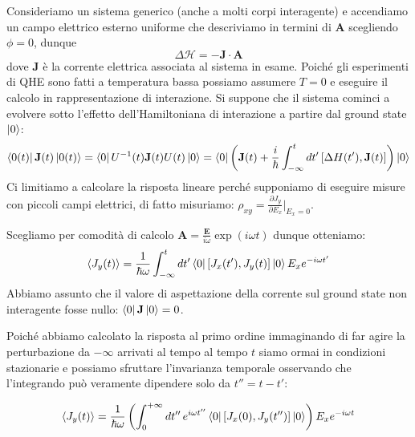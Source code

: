 \documentclass[12pt,a4paper]{article}
\begin{document}
Consideriamo un sistema generico (anche  a molti corpi interagente) e accendiamo un campo elettrico esterno uniforme che descriviamo in  termini di $\mathbf{A}$ scegliendo $\phi = 0$, dunque $$\Delta \mathcal{H} = - \mathbf{J} \cdot \mathbf{A}$$ dove $\mathbf{J}$ è la corrente elettrica associata al sistema in esame.
Poiché gli esperimenti di QHE sono fatti a temperatura bassa possiamo assumere $T = 0$ e eseguire il calcolo in rappresentazione di interazione. Si suppone che il sistema cominci a evolvere sotto l'effetto dell'Hamiltoniana di interazione a partire dal ground state $\ket{0}$:
\begin{equation}
\bra{0(t)} \mathbf{J}(t) \ket{0(t)} = \bra{0} U^{-1} (t) \mathbf{J}(t) U(t) \ket{0} = \bra{0} \left( \mathbf{J}(t) + \frac{i}{\hbar} \int_{-\infty}^{t} dt' \left[\Delta H (t'), \mathbf{J}(t)\right] \right) \ket{0}
\end{equation} \label{calcolo}
Ci limitiamo a calcolare la risposta lineare perché supponiamo di eseguire misure con piccoli campi elettrici, di fatto misuriamo: $\rho_{xy} = \frac{\partial J_y}{\partial E_x} \Bigr|_{E_x = 0}$. 

Scegliamo per comodità di calcolo $\mathbf{A} = \frac{\mathbf{E}}{i \omega} \exp \left( i \omega t \right)$ dunque otteniamo:
\begin{equation}
\langle J_y(t) \rangle = \frac{1}{\hbar \omega} \int_{-\infty}^{t} dt' \bra{0} \left[ J_{x} (t'), J_{y}(t) \right] \ket{0} E_{x} e^{-i \omega t'}
\end{equation}
Abbiamo assunto che il valore di aspettazione della corrente sul ground state non interagente fosse nullo: $\bra{0} \mathbf{J} \ket{0} = 0$.

Poiché abbiamo calcolato la risposta al primo ordine immaginando di far agire la perturbazione da $-\infty$ arrivati al tempo al tempo $t$ siamo ormai in condizioni stazionarie e possiamo sfruttare l'invarianza temporale osservando che l'integrando può veramente dipendere solo da $t'' = t - t'$:

\begin{equation}
\langle J_y(t) \rangle = \frac{1}{\hbar \omega} \left( \int_{0}^{+\infty} dt'' \, e^{i \omega t''} \bra{0} \left[ J_{x} (0), J_{y}(t'') \right] \ket{0} \right) E_{x} e^{-i \omega t}
\end{equation}
\end{document}
